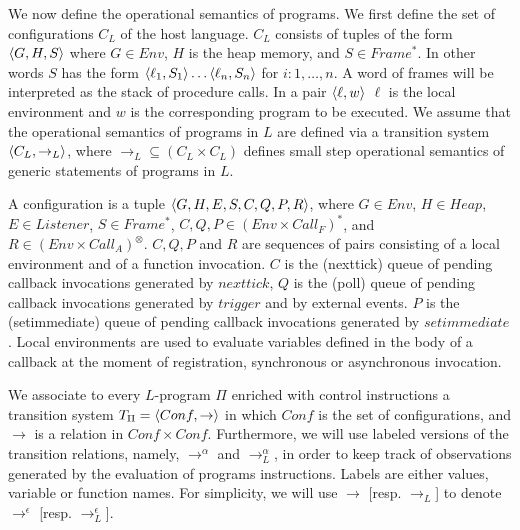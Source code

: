 We now define the operational semantics of programs.
We first define the set of configurations $C_L$ of the host language.
$C_L$ consists of tuples of the form  $\langle G,H,S \rangle$ where $G\in Env$, $H$ is the heap memory, and $S\in Frame^*$. 
In other words $S$ has the form $\langle \ell_1,S_1 \rangle\ldots\langle \ell_n,S_n \rangle$ for $i:1,\ldots,n$.
A word of frames will be interpreted as the stack of procedure calls.
In a pair $\langle \ell,w \rangle$  $\ell$ is the local environment and $w$ is the corresponding program to be executed. 
We assume that the operational semantics of programs in $L$ are defined via a transition system  
$\langle C_L,\rightarrow_L \rangle$,  where $\rightarrow_L\subseteq (C_L\times C_L)$ defines small step operational semantics of generic statements of programs in $L$.

A configuration is a tuple $\langle G,H,E,S,C,Q,P,R \rangle$,  where  $G\in Env$, $H\in Heap$, $E\in Listener$, 
$S\in Frame^*$,  $C,Q,P\in (Env\times Call_F)^*$,  and $R\in (Env\times Call_A)^\otimes$.
$C,Q,P$ and $R$ are sequences of pairs consisting of a local environment and of a function invocation.
$C$ is the (nexttick) queue of pending callback invocations generated by $nexttick$,
$Q$ is the (poll) queue of pending callback invocations generated by $trigger$ and by external events.
$P$ is the (setimmediate) queue of pending callback invocations generated by $setimmediate$.
Local environments are used to evaluate variables defined in the body of a callback at the moment of registration, synchronous or asynchronous invocation. 

We associate to every $L$-program $\Pi$ enriched with control instructions a transition system  $T_\Pi=\langle Conf,\rightarrow \rangle$ in which $Conf$ is the set of  configurations, and  $\rightarrow$ is a relation in $Conf\times Conf$.
Furthermore, we will use labeled versions of the transition relations, namely, $\rightarrow^\alpha$ and  $\rightarrow_L^\alpha$, in order to keep track of observations generated by the evaluation of programs instructions. Labels are either values, variable or function names.
For simplicity, we will use $\rightarrow$ [resp. $\rightarrow_L$] to denote 
$\rightarrow^\epsilon$ [resp. $\rightarrow_L^\epsilon$].

